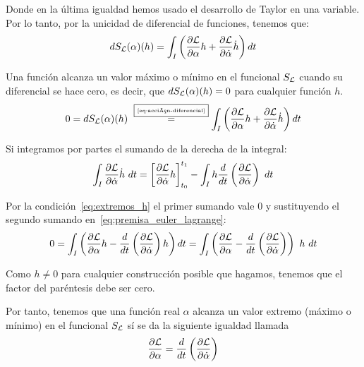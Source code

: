 Donde en la última igualdad hemos usado el desarrollo de Taylor en una variable.
Por lo tanto, por la unicidad de diferencial de funciones, tenemos que:
\begin{equation}
	\label{eq:acción-diferencial}
	dS_{\mathcal{L}}(\alpha)(h)=\int_{I}\left( \frac{\partial \mathcal{L}}{\partial\alpha}h+\frac{\partial \mathcal{L}}{\partial\dot{\alpha}}\dot{h}\right) dt
\end{equation}

Una función alcanza un valor máximo o mínimo en el funcional $S_{\mathcal{L}}$ cuando su diferencial se hace cero, es decir, que $dS_{\mathcal{L}}(\alpha)(h)=0$ para cualquier función $h$.
\begin{equation}
	\label{eq:premisa_euler_lagrange}
		0 = dS_{\mathcal{L}}(\alpha)(h)~\overset{\fbox{\tiny \ref{eq:acción-diferencial}}}{=} \int_{I}\left( \frac{\partial \mathcal{L}}{\partial\alpha}h+\frac{\partial \mathcal{L}}{\partial\dot{\alpha}}\dot{h}\right) dt
\end{equation}

Si integramos por partes el sumando de la derecha de la integral:
\begin{equation*}
	\int_{I}\frac{\partial \mathcal{L}}{\partial\dot{\alpha}}\dot{h}\ dt = \left[ \frac{\partial \mathcal{L}}{\partial \dot{\alpha}}h \right]_{t_0}^{t_1}  - \int_I h \frac{d}{dt}\left( \frac{\partial\mathcal{L}}{\partial\dot\alpha}\right)\ dt
\end{equation*}

Por la condición~\eqref{eq:extremos_h} el primer sumando vale $0$ y sustituyendo el segundo sumando en~\eqref{eq:premisa_euler_lagrange}:
\begin{equation*}
	0 = \int_{I}\left(\frac{\partial \lagrangiano}{\partial\alpha}h - \frac{d}{dt}\left(\frac{\partial\lagrangiano}{\partial\dot\alpha}\right)h\right)dt = \int_{I}\left(\frac{\partial \lagrangiano}{\partial\alpha} - \frac{d}{dt}\left( \frac{\partial\lagrangiano}{\partial\dot\alpha}\right)\right)\ h\ dt
\end{equation*}

Como $h \neq 0$ para cualquier construcción posible que hagamos, tenemos que el factor del paréntesis debe ser cero.

Por tanto, tenemos que una función real $\alpha$ alcanza un valor extremo (máximo o mínimo) en el funcional $S_{\mathcal{L}}$ sí se da la siguiente igualdad llamada 
\begin{equation}
	\label{eq:euler-lagrange}
	\frac{\partial \mathcal{L}}{\partial \alpha}=\frac{d}{dt}\left( \frac{\partial \mathcal{L}}{\partial \dot{\alpha}} \right)
\end{equation}

